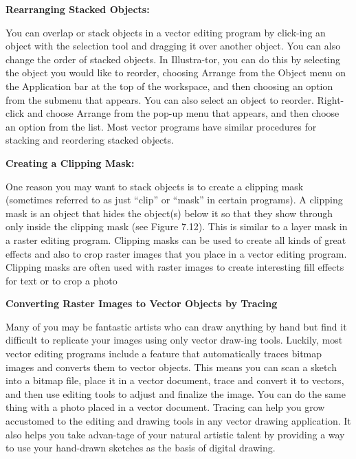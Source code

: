 \documentclass{report}
\begin{document}
    \bigbreak \noindent \bigbreak \noindent 
    \begin{Large}
      \textbf{Rearranging Stacked Objects:}
    \end{Large}
    \bigbreak \noindent 
    You can overlap or stack objects in a vector editing program by click-ing an object with the selection tool and dragging it over another object. You can also change the order of stacked objects. In Illustra-tor, you can do this by selecting the object you would like to reorder, choosing Arrange from the Object menu on the Application bar at the top of the workspace, and then choosing an option from the submenu that appears. You can also select an object to reorder. Right-click and choose Arrange from the pop-up menu that appears, and then choose an option from the list. Most vector programs have similar procedures for stacking and reordering stacked objects.

    \bigbreak \noindent \bigbreak \noindent 
    \begin{Large}
      \textbf{Creating a Clipping Mask:}
    \end{Large}
    \bigbreak \noindent 
    One reason you may want to stack objects is to create a clipping mask (sometimes referred to as just “clip” or “mask” in certain programs).
    \bigbreak \noindent 
    A clipping mask is an object that hides the object(s) below it so that they show through only inside the clipping mask (see Figure 7.12). This is similar to a layer mask in a raster editing program.
    \bigbreak \noindent 
    Clipping masks can be used to create all kinds of great effects and also to crop raster images that you place in a vector editing program. Clipping masks are often used with raster images to create interesting fill effects for text or to crop a photo

    \bigbreak \noindent \bigbreak \noindent 
    \begin{Large}
      \textbf{Converting Raster Images to Vector Objects by Tracing}
    \end{Large}
    \bigbreak \noindent 
    Many of you may be fantastic artists who can draw anything by hand but find it difficult to replicate your images using only vector draw-ing tools. Luckily, most vector editing programs include a feature that automatically traces bitmap images and converts them to vector objects. This means you can scan a sketch into a bitmap file, place it in a vector document, trace and convert it to vectors, and then use editing tools to adjust and finalize the image. You can do the same thing with a photo placed in a vector document. 
    \bigbreak \noindent 
    Tracing can help you grow accustomed to the editing and drawing tools in any vector drawing application. It also helps you take advan-tage of your natural artistic talent by providing a way to use your  hand-drawn sketches as the basis of digital drawing.
\end{document}
